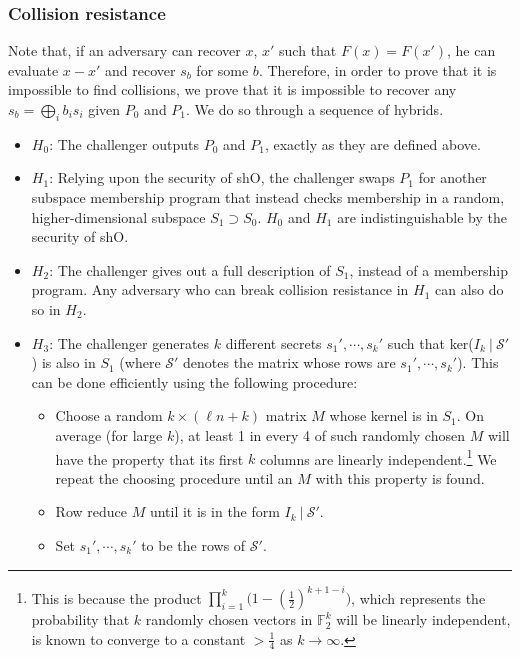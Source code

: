 \documentclass{article}
\begin{document}
\subsubsection{Collision resistance}
Note that, if an adversary can recover $x$, $x'$ such that $F(x) = F(x')$, he can evaluate $x - x'$ and recover $s_b$ for some $b$. Therefore, in order to prove that it is impossible to find collisions, we prove that it is impossible to recover any $s_b = \bigoplus_i b_is_i$ given $P_0$ and $P_1$. We do so through a sequence of hybrids.

\begin{itemize}
    \item $H_0$: The challenger outputs $P_0$ and $P_1$, exactly as they are defined above.
    \item $H_1$: Relying upon the security of \textsf{shO}, the challenger swaps $P_1$ for another subspace membership program that instead checks membership in a random, higher-dimensional subspace $S_1 \supset S_0$. $H_0$ and $H_1$ are indistinguishable by the security of \textsf{shO}.
    \item $H_2$: The challenger gives out a full description of $S_1$, instead of a membership program. Any adversary who can break collision resistance in $H_1$ can also do so in $H_2$.
    \item $H_3$: The challenger generates $k$ different secrets $s_1', \cdots, s_k'$ such that ker($I_k \: | \: \mathcal{S}'$) is also in $S_1$ (where $\mathcal{S}'$ denotes the matrix whose rows are $s_1', \cdots, s_k'$). This can be done efficiently using the following procedure:
    \begin{itemize}
        \item Choose a random $k \times (\ell n+k)$ matrix $M$ whose kernel is in $S_1$. On average (for large $k$), at least 1 in every 4 of such randomly chosen $M$ will have the property that its first $k$ columns are linearly independent.\footnote{This is because the product $\prod_{i=1}^k \big(1-(\frac{1}{2})^{k+1-i}\big)$, which represents the probability that $k$ randomly chosen vectors in $\mathbb{F}_2^k$ will be linearly independent, is known to converge to a constant $ > \frac{1}{4}$ as $k \rightarrow \infty$.} We repeat the choosing procedure until an $M$ with this property is found.
        \item Row reduce $M$ until it is in the form $I_k \: | \: \mathcal{S}'$.
        \item Set $s_1', \cdots, s_k'$ to be the rows of $\mathcal{S}'$.
    \end{itemize}
    

\end{itemize}
\end{document}
